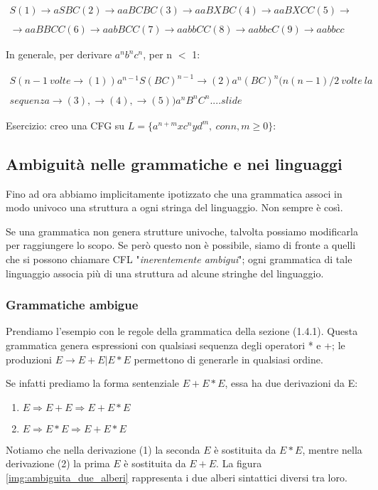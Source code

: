 \documentclass[11pt]{article}
\begin{document}
\begin{equation*}\label{stigeiz}\begin{split}
S (1)\rightarrow aSBC (2)\rightarrow aaBCBC (3)\rightarrow aaBXBC (4) \rightarrow aaBXCC (5) \rightarrow \\&\\ \rightarrow aaBBCC (6)\rightarrow aabBCC (7)\rightarrow aabbCC (8)\rightarrow aabbcC (9)\rightarrow aabbcc
\end{split}
\end{equation*}

In generale, per derivare $a^nb^nc^n$, per n $<$ 1:

\begin{equation*}
\begin{split}
S(n-1 \medspace volte \rightarrow (1)) a^{n-1}S(BC)^{n-1}\rightarrow (2) a^n(BC)^n(n(n-1)/2 \medspace volte \medspace la \\&\\ sequenza \rightarrow (3), \rightarrow (4), \rightarrow (5))a^nB^nC^n....slide
\end{split}
\end{equation*}

Esercizio: creo una CFG su $L = \{a^{n+m}xc^nyd^m, \medspace con n,m \geq 0\}$:

\subsection{Ambiguità nelle grammatiche e nei linguaggi}
Fino ad ora abbiamo implicitamente ipotizzato che una grammatica associ in modo univoco una struttura a ogni stringa del linguaggio. Non sempre è così. 

Se una grammatica non genera strutture univoche, talvolta possiamo modificarla per raggiungere lo scopo. Se però questo non è possibile, siamo di fronte a quelli che si possono chiamare CFL "\textit{inerentemente ambigui}"; ogni grammatica di tale linguaggio associa più di una struttura ad alcune stringhe del linguaggio.

\subsubsection{Grammatiche ambigue}
Prendiamo l'esempio con le regole della grammatica della sezione (1.4.1). Questa grammatica genera espressioni con qualsiasi sequenza degli operatori * e +; le produzioni $E \rightarrow E +E |E*E$ permettono di generarle in qualsiasi ordine.

Se infatti prediamo la forma sentenziale $E+E*E$, essa ha due derivazioni da E:
\begin{enumerate}
	\item $E \Rightarrow E+E \Rightarrow E+E*E$
	\item $E \Rightarrow E*E \Rightarrow E+E*E$
\end{enumerate} 
Notiamo che nella derivazione (1) la seconda $E$ è sostituita da $E*E$, mentre nella derivazione (2) la prima $E$ è sostituita da $E+E$. La figura \ref{img:ambiguita_due_alberi} rappresenta i due alberi sintattici diversi tra loro.
\end{document}
